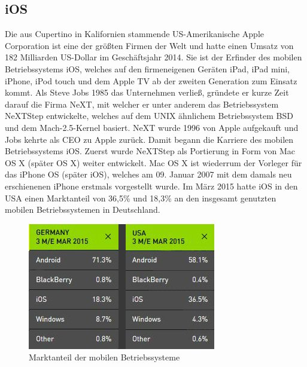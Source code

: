 \subsection{iOS}
	Die aus Cupertino in Kalifornien stammende US-Amerikanische Apple Corporation
	ist eine der größten Firmen der Welt und hatte einen Umsatz von 182 Milliarden
	US-Dollar im Geschäftsjahr 2014. Sie ist der Erfinder des mobilen
	Betriebssystems iOS, welches auf den firmeneigenen Geräten iPad, iPad mini,
	iPhone, iPod touch und dem Apple TV ab der zweiten Generation zum Einsatz
	kommt. Als Steve Jobs 1985 das Unternehmen verließ, gründete er
	kurze Zeit darauf die Firma NeXT, mit welcher er unter anderem das
	Betriebssystem NeXTStep entwickelte, welches auf dem UNIX ähnlichem
	Betriebssystem BSD\cite[S.12]{Tanenbaum2009} und dem Mach-2.5-Kernel
	\cite{MachProject2015} basiert. NeXT wurde 1996 von Apple aufgekauft und Jobs
	kehrte als CEO zu Apple zurück. Damit begann die Karriere des mobilen
	Betriebssystems iOS. Zuerst wurde NeXTStep als Portierung in Form von Mac OS X
	(später OS X) weiter entwickelt. Mac OS X ist wiederrum der Vorleger für das
	iPhone OS (später iOS), welches am 09. Januar 2007 mit dem damals neu
	erschienenen iPhone erstmals vorgestellt wurde. Im März 2015 hatte iOS in den USA einen
	Marktanteil von 36,5\% und 18,3\% an den insgesamt genutzten mobilen
	Betriebssystemen in Deutschland\cite{MobileOsStat}.
	
	\begin{figure}[h]
		\centering
		\includegraphics[width=0.5\linewidth]{ios/media/marketshare-cmp-201503.jpg}
		\caption{Marktanteil der mobilen Betriebssysteme
		\cite{MobileOsStat}}
		\label{fig:marcetshare}
	\end{figure}